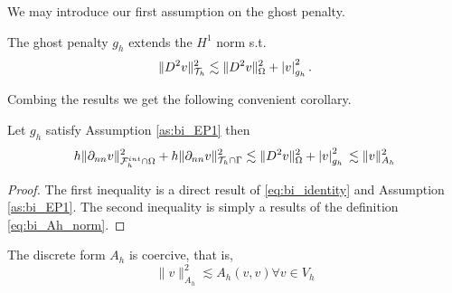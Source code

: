 We may introduce our first assumption on the ghost penalty.
\begin{assumption}[EP1]
    \label{as:bi_EP1}
    The ghost penalty $g_{h}$ extends the $H^{1}$ norm s.t. \[
    \| D^2 v \|_{ \mathcal{T} _{h} }^{ 2 } \lesssim  \| D^2 v \|_{ \Omega  }^{ 2 } + \left\lvert  v  \right\rvert _{g_{h}}^{2}.
    \]
\end{assumption}


Combing the results we get the following convenient corollary.

\begin{corollary}
    \label{cor:bi_inverse_thm}
    Let $g_{h}$ satisfy Assumption \ref{as:bi_EP1} then
    \[
            h\| \partial _{nn}  v \|_{ \mathcal{F}_h^{int} \cap \Omega    }^{2 } + h\| \partial _{nn} v \|_{ \mathcal{T} _{h} \cap \Gamma  }^{2  }   \lesssim  \| D^2 v \|_{ \Omega  }^{ 2 } + \left\lvert  v  \right\rvert _{g_{h}}^{2} \\
              \lesssim \| v \|_{ A_{h} }^{  2}
    \]
\end{corollary}
\begin{proof}
    The first inequality is a direct result of \eqref{eq:bi_identity} and Assumption \ref{as:bi_EP1}. The second inequality is simply a results of the definition \eqref{eq:bi_Ah_norm}.
\end{proof}

\begin{lemma}
    The discrete form $A_{h}$ is coercive, that is, \[
    \| v \|_{ A_{h} }^{ 2 }  \lesssim A_{h}( v,v) \forall v \in V_{h}
    \]
\end{lemma}

